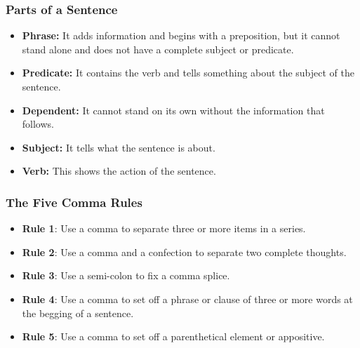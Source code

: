 
\subsubsection*{Parts of a Sentence}

\begin{itemize}
	\item \textbf{Phrase:} It adds information and begins with a preposition, but
		it cannot stand alone and does not have a complete subject or predicate.
	\item \textbf{Predicate:} It contains the verb and tells something about the
		subject of the sentence.
	\item \textbf{Dependent:} It cannot stand on its own without the information
		that follows.
	\item \textbf{Subject:} It tells what the sentence is about.
	\item \textbf{Verb:} This shows the action of the sentence.
\end{itemize}

\subsubsection*{The Five Comma Rules}

\begin{itemize}
	\item \textbf{Rule 1}: Use a comma to separate three or more items in a series.
	\item \textbf{Rule 2}: Use a comma and a confection to separate two complete thoughts.
	\item \textbf{Rule 3}: Use a semi-colon to fix a comma splice.
	\item \textbf{Rule 4}: Use a comma to set off a phrase or clause of three or more words at the begging of a sentence. 
	\item \textbf{Rule 5}: Use a comma to set off a parenthetical element or appositive.
\end{itemize}

\newpage
